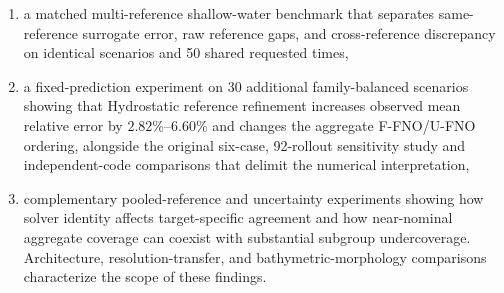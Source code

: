 \begin{enumerate}[leftmargin=3.6em]
    \item a matched multi-reference shallow-water benchmark that separates same-reference surrogate error, raw reference gaps, and cross-reference discrepancy on identical scenarios and 50 shared requested times,
    \item a fixed-prediction experiment on $30$ additional family-balanced scenarios showing that Hydrostatic reference refinement increases observed mean relative error by $2.82\%$--$6.60\%$ and changes the aggregate F-FNO/U-FNO ordering, alongside the original six-case, 92-rollout sensitivity study and independent-code comparisons that delimit the numerical interpretation,
    \item complementary pooled-reference and uncertainty experiments showing how solver identity affects target-specific agreement and how near-nominal aggregate coverage can coexist with substantial subgroup undercoverage. Architecture, resolution-transfer, and bathymetric-morphology comparisons characterize the scope of these findings.
\end{enumerate}
